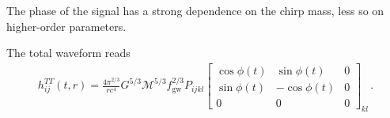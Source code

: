 \documentclass[main.tex]{subfiles}
\begin{document}
The phase of the signal has a strong dependence on the chirp mass, less so on higher-order parameters. 

The total waveform reads 
%
\begin{align}
h_{ij}^{TT} (t, r) = \frac{4 \pi^{2/3}}{r c^{4}} G^{5/3} \mathcal{M}^{5/3} f _{\text{gw}}^{2/3} P_{ijkl} \left[\begin{array}{ccc}
\cos \phi (t) & \sin \phi (t) & 0 \\ 
\sin \phi (t) & - \cos \phi (t) & 0 \\ 
0 & 0 & 0
\end{array}\right]_{kl}
\,.
\end{align}
\end{document}
